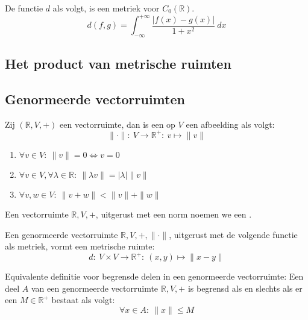 \documentclass[main.tex]{subfiles}
\begin{document}
\begin{vb}
  De functie $d$ als volgt, is een metriek voor $C_{0}(\mathbb{R})$.
  \[ d(f,g) = \int_{-\infty}^{+\infty}\frac{|f(x)-g(x)|}{1+x^{2}}\ dx \]
\end{vb}


\subsection{Het product van metrische ruimten}
\label{sec:het-product-van}


\subsection{Genormeerde vectorruimten}
\label{sec:genorm-vect}

\begin{de}
  \label{de:norm}
  Zij $(\mathbb{R},V,+)$ een vectorruimte, dan is een  op $V$ een afbeelding als volgt:
  \[ \|\cdot\|:\ V \rightarrow \mathbb{R}^{+}:\ v \mapsto \|v\| \]
  \begin{enumerate}
  \item $\forall v\in V:\ \|v\| = 0 \Leftrightarrow v=0$
  \item $\forall v\in V, \forall \lambda \in \mathbb{R}:\ \|\lambda v\| = |\lambda|\|v\|$
  \item $\forall v,w\in V:\ \|v+w\| < \|v\| + \|w\|$
  \end{enumerate}
\end{de}

\begin{de}
  Een vectorruimte $\mathbb{R},V,+$, uitgerust met een norm noemen we een .
\end{de}

\begin{st}
  Een genormeerde vectorruimte $\mathbb{R},V,+,\|\cdot\|$, uitgerust met de volgende functie als metriek, vormt een metrische ruimte:
  \[ d:\ V \times V \rightarrow \mathbb{R}^{+}:\ (x,y) \mapsto \|x-y\| \]
\end{st}

\begin{st}
  Equivalente definitie voor begrensde delen in een genormeerde vectorruimte:
  Een deel $A$ van een genormeerde vectorruimte $\mathbb{R},V,+$ is begrensd als en slechts als er een $M \in \mathbb{R}^{+}$ bestaat als volgt:
  \[ \forall x\in A:\ \|x\| \le M \]
\end{st}
\end{document}
